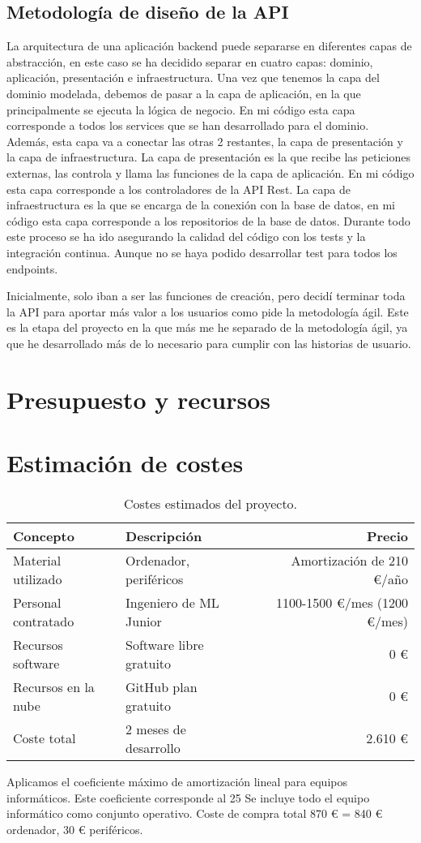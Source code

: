 \subsection*{Metodología de diseño de la API}
La arquitectura de una aplicación backend puede separarse en diferentes capas de abstracción, en este caso se ha decidido separar en cuatro capas: dominio, aplicación, presentación e infraestructura.
Una vez que tenemos la capa del dominio modelada, debemos de pasar a la capa de aplicación, en la que principalmente se ejecuta la lógica de negocio. En mi código esta capa
corresponde a todos los services que se han desarrollado para el dominio. Además, esta capa va a conectar las otras 2 restantes, la capa de presentación y la capa de infraestructura.
La capa de presentación es la que recibe las peticiones externas, las controla y llama las funciones de la capa de aplicación. En mi código esta capa corresponde a los controladores de la API Rest.
La capa de infraestructura es la que se encarga de la conexión con la base de datos, en mi código esta capa corresponde a los repositorios de la base de datos.
Durante todo este proceso se ha ido asegurando la calidad del código con los tests y la integración continua. Aunque no se haya podido desarrollar test para todos los endpoints.

Inicialmente, solo iban a ser las funciones de creación, pero decidí terminar toda la API para aportar más valor a los usuarios como pide la metodología ágil.
Este es la etapa del proyecto en la que más me he separado de la metodología ágil, ya que he desarrollado más de lo necesario para cumplir con las historias de usuario.


\section{Presupuesto y recursos}

\section{Estimación de costes}


\begin{table}[H]
    \centering
    \begin{tabular}{| l | l | r |}
        \hline
        \textbf{Concepto}   & \textbf{Descripción}    & \textbf{Precio}              \\
        \hline
        Material utilizado  & Ordenador, periféricos  & Amortización de 210 €/año    \\
        Personal contratado & Ingeniero de ML Junior  & 1100-1500 €/mes (1200 €/mes) \\
        Recursos software   & Software libre gratuito & 0 €                          \\
        Recursos en la nube & GitHub plan gratuito    & 0 €                          \\
        \hline
        Coste total         & 2 meses de desarrollo   & 2.610 €                      \\
        \hline
    \end{tabular}
    \caption{Costes estimados del proyecto.}
\end{table}

Aplicamos el coeficiente máximo de amortización lineal para equipos informáticos. Este coeficiente corresponde al 25%
Se incluye todo el equipo informático como conjunto operativo. Coste de compra total 870 € = 840 € ordenador, 30 € periféricos. \cite{lis}
